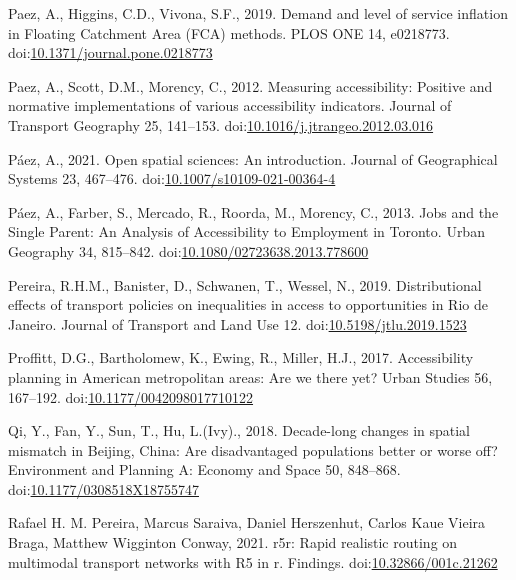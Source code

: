 \documentclass[]{elsarticle} %
\newlength{\cslhangindent}
\newlength{\cslentryspacingunit} %
\newenvironment{CSLReferences}[2] %
 {%
  \setlength{\parindent}{0pt}
  \ifodd #1
  \let\oldpar\par
  \def\par{\hangindent=\cslhangindent\oldpar}
  \fi
  \setlength{\parskip}{#2\cslentryspacingunit}
 }%
 {}
\begin{document}
\begin{CSLReferences}{1}{0}
\leavevmode{}%
Paez, A., Higgins, C.D., Vivona, S.F., 2019. Demand and level of service
inflation in Floating Catchment Area (FCA) methods. PLOS ONE 14,
e0218773.
doi:\href{https://doi.org/10.1371/journal.pone.0218773}{10.1371/journal.pone.0218773}

\leavevmode{}%
Paez, A., Scott, D.M., Morency, C., 2012. Measuring accessibility:
Positive and normative implementations of various accessibility
indicators. Journal of Transport Geography 25, 141--153.
doi:\href{https://doi.org/10.1016/j.jtrangeo.2012.03.016}{10.1016/j.jtrangeo.2012.03.016}

\leavevmode{}%
Páez, A., 2021. Open spatial sciences: An introduction. Journal of
Geographical Systems 23, 467--476.
doi:\href{https://doi.org/10.1007/s10109-021-00364-4}{10.1007/s10109-021-00364-4}

\leavevmode{}%
Páez, A., Farber, S., Mercado, R., Roorda, M., Morency, C., 2013. Jobs
and the {Single} {Parent}: {An} {Analysis} of {Accessibility} to
{Employment} in {Toronto}. Urban Geography 34, 815--842.
doi:\href{https://doi.org/10.1080/02723638.2013.778600}{10.1080/02723638.2013.778600}

\leavevmode{}%
Pereira, R.H.M., Banister, D., Schwanen, T., Wessel, N., 2019.
Distributional effects of transport policies on inequalities in access
to opportunities in {Rio} de {Janeiro}. Journal of Transport and Land
Use 12.
doi:\href{https://doi.org/10.5198/jtlu.2019.1523}{10.5198/jtlu.2019.1523}

\leavevmode{}%
Proffitt, D.G., Bartholomew, K., Ewing, R., Miller, H.J., 2017.
Accessibility planning in American metropolitan areas: Are we there yet?
Urban Studies 56, 167--192.
doi:\href{https://doi.org/10.1177/0042098017710122}{10.1177/0042098017710122}

\leavevmode{}%
Qi, Y., Fan, Y., Sun, T., Hu, L.(Ivy)., 2018. Decade-long changes in
spatial mismatch in {Beijing}, {China}: {Are} disadvantaged populations
better or worse off? Environment and Planning A: Economy and Space 50,
848--868.
doi:\href{https://doi.org/10.1177/0308518X18755747}{10.1177/0308518X18755747}

\leavevmode{}%
Rafael H. M. Pereira, Marcus Saraiva, Daniel Herszenhut, Carlos Kaue
Vieira Braga, Matthew Wigginton Conway, 2021. r5r: Rapid realistic
routing on multimodal transport networks with R5 in r. Findings.
doi:\href{https://doi.org/10.32866/001c.21262}{10.32866/001c.21262}


\end{CSLReferences}
\end{document}
